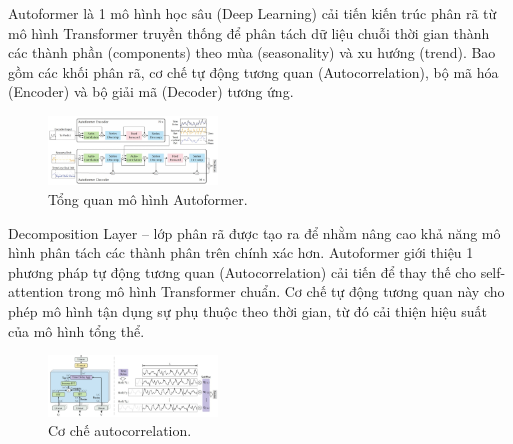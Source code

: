 Autoformer là 1 mô hình học sâu (Deep Learning) cải tiến kiến trúc phân rã từ mô hình Transformer truyền thống để phân tách dữ liệu chuỗi thời gian thành các thành phần (components) theo mùa (seasonality) và xu hướng (trend). Bao gồm các khối phân rã, cơ chế tự động tương quan (Autocorrelation), bộ mã hóa (Encoder) và bộ giải mã (Decoder) tương ứng.

\begin{figure}[htbp]
\centerline{\includegraphics[width=0.4\textwidth]{img/autoformer.jpg}}
\caption{Tổng quan mô hình Autoformer.}
\label{fig}
\end{figure}

Decomposition Layer – lớp phân rã được tạo ra để nhằm nâng cao khả năng mô hình phân tách các thành phân trên chính xác hơn. Autoformer giới thiệu 1 phương pháp tự động tương quan (Autocorrelation) cải tiến để thay thế cho self-attention trong mô hình Transformer chuẩn. Cơ chế tự động tương quan này cho phép mô hình tận dụng sự phụ thuộc theo thời gian, từ đó cải thiện hiệu suất của mô hình tổng thể.

\begin{figure}[htbp]
\centerline{\includegraphics[width=0.4\textwidth]{img/autocorrelation.jpg}}
\caption{Cơ chế autocorrelation.}
\label{fig}
\end{figure}